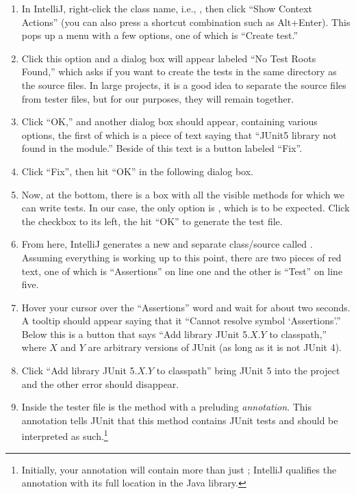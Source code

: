 \begin{enumerate}[label=(\arabic*)]
  \item In IntelliJ, right-click the class name, i.e., , then click ``Show Context Actions'' (you can also press a shortcut combination such as Alt+Enter). 
This pops up a menu with a few options, one of which is ``Create test.''
  \item Click this option and a dialog box will appear labeled ``No Test Roots Found,'' which asks if you want to create the tests in the same directory as the source files. 
In large projects, it is a good idea to separate the source files from tester files, but for our purposes, they will remain together. 
  \item Click ``OK,'' and another dialog box should appear, containing various options, the first of which is a piece of text saying that ``JUnit5 library not found in the module.'' Beside of this text is a button labeled ``Fix''. 
  \item Click ``Fix'', then hit ``OK'' in the following dialog box. 
  \item Now, at the bottom, there is a box with all the visible methods for which we can write tests. In our case, the only option is , which is to be expected. Click the checkbox to its left, the hit ``OK'' to generate the test file.
  \item From here, IntelliJ generates a new and separate class/source called . 
Assuming everything is working up to this point, there are two pieces of red text, one of which is ``Assertions'' on line one and the other is ``Test'' on line five. 
  \item Hover your cursor over the ``Assertions'' word and wait for about two seconds. A tooltip should appear saying that it ``Cannot resolve symbol `Assertions'.'' Below this is a button that says ``Add library JUnit 5.$X$.$Y$ to classpath,'' where $X$ and $Y$ are arbitrary versions of JUnit (as long as it is not JUnit 4). 
  \item Click ``Add library JUnit 5.$X$.$Y$ to classpath'' bring JUnit 5 into the project and the other error should disappear.
  \item Inside the tester file is the  method with a preluding \emph{annotation}. This  annotation tells JUnit that this method contains JUnit tests and should be interpreted as such.\footnote{Initially, your annotation will contain more than just ; IntelliJ qualifies the annotation with its full location in the Java library.} 
\end{enumerate}
